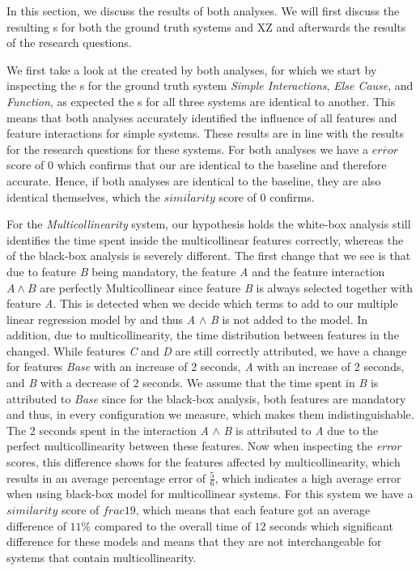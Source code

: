 In this section, we discuss the results of both analyses. We will first discuss the resulting {\perfInfluenceModel}s 
for both the ground truth systems and \textsc{XZ} and afterwards the results of the research questions.

We first take a look at the {\perfInfluenceModel} created by both analyses, 
for which we start by inspecting the {\perfInfluenceModel}s for the ground truth system \emph{Simple Interactions}, 
\emph{Else Cause}, and \emph{Function}, as expected the {\perfInfluenceModel}s for all three systems are identical to another. 
This means that both analyses accurately identified the influence of all features and feature interactions for simple systems.
These results are in line with the results for the research questions for these systems. For both analyses
we have a $\overline{error}$ score of $0$ which confirms that our {\perfInfluenceModel} are identical to the baseline and therefore 
accurate. Hence, if both analyses {\perfInfluenceModel} are identical to the baseline, they are also identical themselves,
which the $\overline{similarity}$ score of $0$ confirms.


For the \emph{Multicollinearity} system, our hypothesis holds the white-box analysis still identifies the time spent inside the multicollinear features correctly, whereas the {\perfInfluenceModel} of the black-box analysis is severely different. The first change that we see is that due to feature \emph{B} being mandatory, the feature \emph{A} and the feature interaction $A \land B$ are perfectly Multicollinear since feature \emph{B} 
is always selected together with feature \emph{A}. 
This is detected when we decide which terms to add to our multiple linear regression model by  
and thus \emph{A} $\land$ \emph{B} is not added to the model. In addition, due to multicollinearity, the time distribution between features in the 
{\perfInfluenceModel} changed. While features \emph{C} and \emph{D} are still correctly attributed, 
we have a change for features \emph{Base} with an increase of 2 seconds, \emph{A} with an increase of 2 seconds, 
and \emph{B} with a decrease of 2 seconds.
We assume that the time spent in \emph{B} is attributed to \emph{Base} since for the black-box analysis, both features are mandatory and
thus, in every configuration we measure, which makes them indistinguishable. 
The 2 seconds spent in the interaction \emph{A} $\land$ \emph{B} is attributed to \emph{A} due to the perfect multicollinearity 
between these features. 
Now when inspecting the \emph{error} scores, this difference shows for the features affected by multicollinearity, 
which results in an average percentage error of $\frac{5}{6}$, 
which indicates a high average error when using black-box model for multicollinear systems.
For this system we have a $\overline{similarity}$ score of $frac{1}{9}$, which means that each feature got an average 
difference of $11\%$ compared to the overall time of $12$ seconds which significant difference for these models and 
means that they are not interchangeable for systems that contain multicollinearity.

